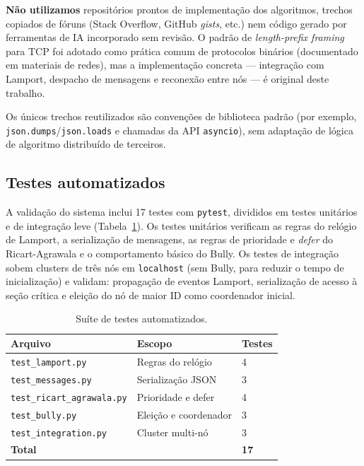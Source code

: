 \documentclass[10pt, a4paper, titlepage]{extarticle}
\begin{document}
\textbf{Não utilizamos} repositórios prontos de implementação dos algoritmos, trechos copiados de fóruns (Stack Overflow, GitHub \emph{gists}, etc.) nem código gerado por ferramentas de IA incorporado sem revisão. O padrão de \emph{length-prefix framing} para TCP foi adotado como prática comum de protocolos binários (documentado em materiais de redes), mas a implementação concreta --- integração com Lamport, despacho de mensagens e reconexão entre nós --- é original deste trabalho.

Os únicos trechos reutilizados são convenções de biblioteca padrão (por exemplo, \texttt{json.dumps}/\texttt{json.loads} e chamadas da API \texttt{asyncio}), sem adaptação de lógica de algoritmo distribuído de terceiros.

\subsection{Testes automatizados}
\label{sec:testes}
A validação do sistema inclui 17 testes com \texttt{pytest}, divididos em testes unitários e de integração leve (Tabela~\ref{tab:testes}). Os testes unitários verificam as regras do relógio de Lamport, a serialização de mensagens, as regras de prioridade e \emph{defer} do Ricart-Agrawala e o comportamento básico do Bully. Os testes de integração sobem clusters de três nós em \texttt{localhost} (sem Bully, para reduzir o tempo de inicialização) e validam: propagação de eventos Lamport, serialização de acesso à seção crítica e eleição do nó de maior ID como coordenador inicial.

\begin{table}[ht]
  \centering
  \caption{Suíte de testes automatizados.}
  \label{tab:testes}
  \begin{tabular}{@{}lll@{}}
    \toprule
    Arquivo & Escopo & Testes \\
    \midrule
    \texttt{test\_lamport.py}       & Regras do relógio       & 4 \\
    \texttt{test\_messages.py}      & Serialização JSON       & 3 \\
    \texttt{test\_ricart\_agrawala.py} & Prioridade e defer   & 4 \\
    \texttt{test\_bully.py}         & Eleição e coordenador   & 3 \\
    \texttt{test\_integration.py}   & Cluster multi-nó        & 3 \\
    \midrule
    \textbf{Total}                 &                         & \textbf{17} \\
    \bottomrule
  \end{tabular}
\end{table}
\end{document}
